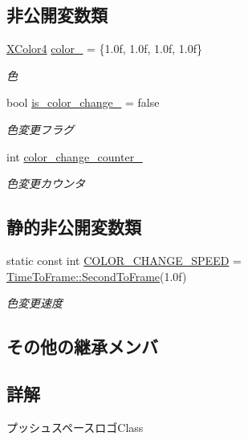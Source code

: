 \subsection*{非公開変数類}
\begin{DoxyCompactItemize}
\item 
\mbox{\hyperlink{_vector3_d_8h_a680c30c4a07d86fe763c7e01169cd6cc}{X\+Color4}} \mbox{\hyperlink{class_push_space_logo_af5bbec0fee0b7370a4b24763b40c19b0}{color\+\_\+}} = \{1.\+0f, 1.\+0f, 1.\+0f, 1.\+0f\}
\begin{DoxyCompactList}\small\item\em 色 \end{DoxyCompactList}\item 
bool \mbox{\hyperlink{class_push_space_logo_a1690cbbed4e0b79bf99a406565f55b0f}{is\+\_\+color\+\_\+change\+\_\+}} = false
\begin{DoxyCompactList}\small\item\em 色変更フラグ \end{DoxyCompactList}\item 
int \mbox{\hyperlink{class_push_space_logo_ad236bf9d2919807fe34446578af868a5}{color\+\_\+change\+\_\+counter\+\_\+}}
\begin{DoxyCompactList}\small\item\em 色変更カウンタ \end{DoxyCompactList}\end{DoxyCompactItemize}
\subsection*{静的非公開変数類}
\begin{DoxyCompactItemize}
\item 
static const int \mbox{\hyperlink{class_push_space_logo_acc30a6322966375508c0d35db7802617}{C\+O\+L\+O\+R\+\_\+\+C\+H\+A\+N\+G\+E\+\_\+\+S\+P\+E\+ED}} = \mbox{\hyperlink{class_time_to_frame_a02fe55cc63bdffd73d092d30cc7f0153}{Time\+To\+Frame\+::\+Second\+To\+Frame}}(1.\+0f)
\begin{DoxyCompactList}\small\item\em 色変更速度 \end{DoxyCompactList}\end{DoxyCompactItemize}
\subsection*{その他の継承メンバ}


\subsection{詳解}
プッシュスペースロゴ\+Class 

